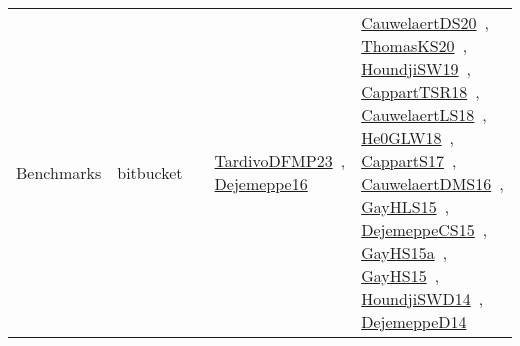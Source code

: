 {\begin{longtable}{lp{3cm}>{\raggedright\arraybackslash}p{6cm}>{\raggedright\arraybackslash}p{6cm}>{\raggedright\arraybackslash}p{8cm}}
Benchmarks & bitbucket &  & \href{../works/TardivoDFMP23.pdf}{TardivoDFMP23}~\cite{TardivoDFMP23}, \href{../works/Dejemeppe16.pdf}{Dejemeppe16}~\cite{Dejemeppe16} & \href{../works/CauwelaertDS20.pdf}{CauwelaertDS20}~\cite{CauwelaertDS20}, \href{../works/ThomasKS20.pdf}{ThomasKS20}~\cite{ThomasKS20}, \href{../works/HoundjiSW19.pdf}{HoundjiSW19}~\cite{HoundjiSW19}, \href{../works/CappartTSR18.pdf}{CappartTSR18}~\cite{CappartTSR18}, \href{../works/CauwelaertLS18.pdf}{CauwelaertLS18}~\cite{CauwelaertLS18}, \href{../works/He0GLW18.pdf}{He0GLW18}~\cite{He0GLW18}, \href{../works/CappartS17.pdf}{CappartS17}~\cite{CappartS17}, \href{../works/CauwelaertDMS16.pdf}{CauwelaertDMS16}~\cite{CauwelaertDMS16}, \href{../works/GayHLS15.pdf}{GayHLS15}~\cite{GayHLS15}, \href{../works/DejemeppeCS15.pdf}{DejemeppeCS15}~\cite{DejemeppeCS15}, \href{../works/GayHS15a.pdf}{GayHS15a}~\cite{GayHS15a}, \href{../works/GayHS15.pdf}{GayHS15}~\cite{GayHS15}, \href{../works/HoundjiSWD14.pdf}{HoundjiSWD14}~\cite{HoundjiSWD14}, \href{../works/DejemeppeD14.pdf}{DejemeppeD14}~\cite{DejemeppeD14}\\

\end{longtable}}
